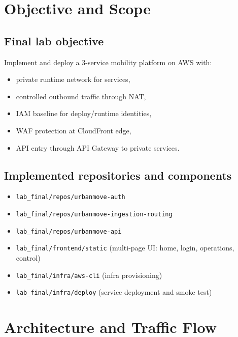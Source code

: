 \documentclass{article}
\begin{document}
\raggedbottom
\setlength{\intextsep}{6pt plus 2pt minus 2pt}
\setlength{\floatsep}{6pt plus 2pt minus 2pt}
\setlength{\textfloatsep}{6pt plus 2pt minus 2pt}

\tableofcontents
\newpage

\section{Objective and Scope}

\subsection{Final lab objective}
Implement and deploy a 3-service mobility platform on AWS with:
\begin{itemize}
    \item private runtime network for services,
    \item controlled outbound traffic through NAT,
    \item IAM baseline for deploy/runtime identities,
    \item WAF protection at CloudFront edge,
    \item API entry through API Gateway to private services.
\end{itemize}

\subsection{Implemented repositories and components}
\begin{itemize}
    \item \texttt{lab\_final/repos/urbanmove-auth}
    \item \texttt{lab\_final/repos/urbanmove-ingestion-routing}
    \item \texttt{lab\_final/repos/urbanmove-api}
    \item \texttt{lab\_final/frontend/static} (multi-page UI: home, login, operations, control)
    \item \texttt{lab\_final/infra/aws-cli} (infra provisioning)
    \item \texttt{lab\_final/infra/deploy} (service deployment and smoke test)
\end{itemize}

\section{Architecture and Traffic Flow}
\end{document}
